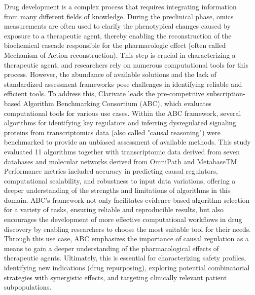 ﻿%

%

Drug development is a complex process that requires integrating information from many different fields of knowledge.
During the preclinical phase, omics measurements are often used to clarify the phenotypical changes caused by exposure to a therapeutic agent, thereby enabling the reconstruction of the biochemical cascade responsible for the pharmacologic effect (often called Mechanism of Action reconstruction).
This step is crucial in characterizing a therapeutic agent, and researchers rely on numerous computational tools for this process.
However, the abundance of available solutions and the lack of standardized assessment frameworks pose challenges in identifying reliable and efficient tools.
To address this, Clarivate leads the pre-competitive subscription-based Algorithm Benchmarking Consortium (ABC), which evaluates computational tools for various use cases.
Within the ABC framework, several algorithms for identifying key regulators and inferring dysregulated signaling proteins from transcriptomics data (also called "causal reasoning") were benchmarked to provide an unbiased assessment of available methods. This study evaluated 11 algorithms together with transcriptomic data derived from seven databases and molecular networks derived from OmniPath and  MetabaseTM. Performance metrics included accuracy in predicting causal regulators, computational scalability, and robustness to input data variations, offering a deeper understanding of the strengths and limitations of algorithms in this domain. ABC's framework not only facilitates evidence-based algorithm selection for a variety of tasks, ensuring reliable and reproducible results, but also encourages the development of more effective computational workflows in drug discovery by enabling researchers to choose the most suitable tool for their needs. Through this use case, ABC emphasizes the importance of causal regulation as a means to gain a deeper understanding of the pharmacological effects of therapeutic agents. Ultimately, this is essential for characterizing safety profiles, identifying new indications (drug repurposing), exploring potential combinatorial strategies with synergistic effects, and targeting clinically relevant patient subpopulations.

